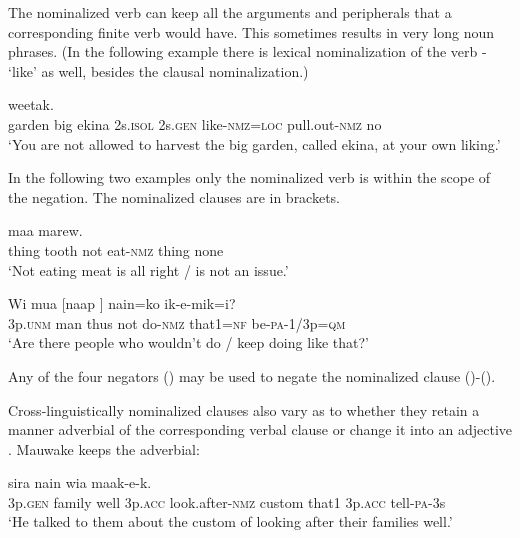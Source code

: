 The nominalized verb can keep all the arguments and peripherals that a corresponding finite verb would have. This sometimes results in very long noun phrases. (In the following example there is lexical nominalization of the verb - `like' as well, besides the clausal nominalization.)

\ea%
\label{ex:x1234}
\gll [\textstyleEmphasizedVernacularWords{Manin(a)} \textstyleEmphasizedVernacularWords{maneka}, \textstyleEmphasizedVernacularWords{ekina}, \textstyleEmphasizedVernacularWords{naisow} \textstyleEmphasizedVernacularWords{nena} \textstyleEmphasizedVernacularWords{kookal-owa}\textstyleEmphasizedVernacularWords{=pa} \textstyleEmphasizedVernacularWords{perek-owa}]  weetak. \\
     garden    big    ekina  2s.\textsc{isol}  2s.\textsc{gen} like-\textsc{nmz}=\textsc{loc}   pull.out-\textsc{nmz}  no \\
\glt `You are not allowed to harvest the big garden, called ekina, at your own liking.'
\z

In the following two examples only the nominalized verb is within the scope of the negation. The nominalized clauses are in brackets.

\ea%
\label{ex:x1235}
  maa  marew. \\
     thing  tooth  not  eat-\textsc{nmz}  thing  none \\
\glt `Not eating meat is all right / is not an issue.'
\z

\ea%
\label{ex:x1236}
\gll Wi  mua  [naap   ]  nain=ko  ik-e-mik=i? \\
     3p.\textsc{unm}  man  thus  not  do-\textsc{nmz}  that1=\textsc{nf}  be-\textsc{pa}-1/3p=\textsc{qm} \\
\glt `Are there people who wouldn't do / keep doing like that?'
\z

Any of the four negators () may be used to negate the nominalized clause ()-(). 

Cross-linguistically nominalized clauses also vary as to whether they retain a manner adverbial of the corresponding verbal clause or change it into an adjective \citep[374]{ComrieEtAl2007}%
. Mauwake keeps the adverbial: 

\ea%
\label{ex:x1237}
  sira  nain wia  maak-e-k. \\
     3p.\textsc{gen}  family  well  3p.\textsc{acc}  look.after-\textsc{nmz}  custom  that1 3p.\textsc{acc}  tell-\textsc{pa}-3s \\
\glt `He talked to them about the custom of looking after their families well.'
\z

